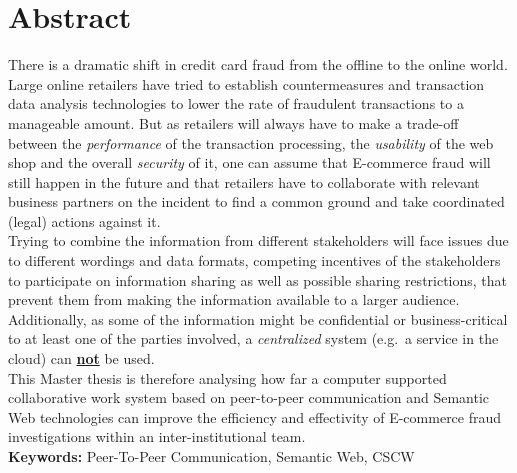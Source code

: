 
\chapter*{Abstract}

There is a dramatic shift in credit card fraud from the offline to the online world. Large online retailers have tried to establish countermeasures and transaction data analysis technologies to lower the rate of fraudulent transactions to a manageable amount. But as retailers will always have to make a trade-off between the \textit{performance} of the transaction processing, the \textit{usability} of the web shop and the overall \textit{security} of it, one can assume that E-commerce fraud will still happen in the future and that retailers have to collaborate with relevant business partners on the incident to find a common ground and take coordinated (legal) actions against it. \\

Trying to combine the information from different stakeholders will face issues due to different wordings and data formats, competing incentives of the stakeholders to participate on information sharing as well as possible sharing restrictions, that prevent them from making the information available to a larger audience. Additionally, as some of the information might be confidential or business-critical to at least one of the parties involved, a \textit{centralized} system (e.g.\ a service in the cloud) can \textbf{\underline{not}} be used. \\

This Master thesis is therefore analysing how far a computer supported collaborative work system based on peer-to-peer communication and Semantic Web technologies can improve the efficiency and effectivity of E-commerce fraud investigations within an inter-institutional team. \\[2em]

\textbf{Keywords:} Peer-To-Peer Communication, Semantic Web, CSCW
